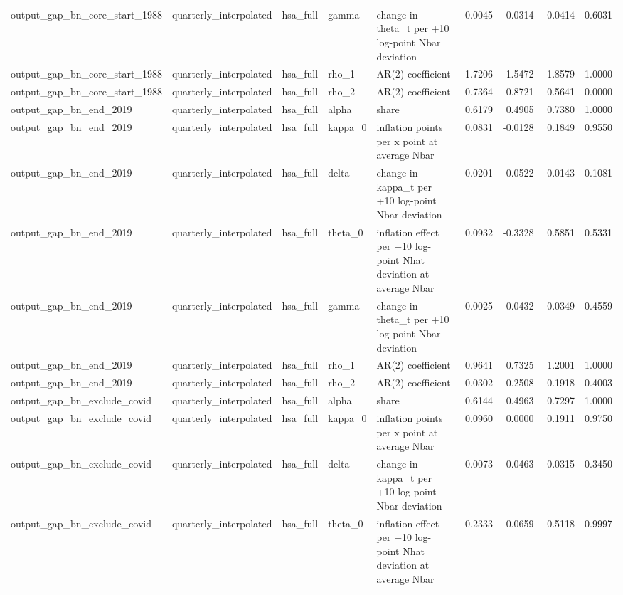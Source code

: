 \begin{tabular}{lllllrrrr}
output\_gap\_bn\_core\_start\_1988 & quarterly\_interpolated & hsa\_full & gamma & change in theta\_t per +10 log-point Nbar deviation & 0.0045 & -0.0314 & 0.0414 & 0.6031 \\
output\_gap\_bn\_core\_start\_1988 & quarterly\_interpolated & hsa\_full & rho\_1 & AR(2) coefficient & 1.7206 & 1.5472 & 1.8579 & 1.0000 \\
output\_gap\_bn\_core\_start\_1988 & quarterly\_interpolated & hsa\_full & rho\_2 & AR(2) coefficient & -0.7364 & -0.8721 & -0.5641 & 0.0000 \\
output\_gap\_bn\_end\_2019 & quarterly\_interpolated & hsa\_full & alpha & share & 0.6179 & 0.4905 & 0.7380 & 1.0000 \\
output\_gap\_bn\_end\_2019 & quarterly\_interpolated & hsa\_full & kappa\_0 & inflation points per x point at average Nbar & 0.0831 & -0.0128 & 0.1849 & 0.9550 \\
output\_gap\_bn\_end\_2019 & quarterly\_interpolated & hsa\_full & delta & change in kappa\_t per +10 log-point Nbar deviation & -0.0201 & -0.0522 & 0.0143 & 0.1081 \\
output\_gap\_bn\_end\_2019 & quarterly\_interpolated & hsa\_full & theta\_0 & inflation effect per +10 log-point Nhat deviation at average Nbar & 0.0932 & -0.3328 & 0.5851 & 0.5331 \\
output\_gap\_bn\_end\_2019 & quarterly\_interpolated & hsa\_full & gamma & change in theta\_t per +10 log-point Nbar deviation & -0.0025 & -0.0432 & 0.0349 & 0.4559 \\
output\_gap\_bn\_end\_2019 & quarterly\_interpolated & hsa\_full & rho\_1 & AR(2) coefficient & 0.9641 & 0.7325 & 1.2001 & 1.0000 \\
output\_gap\_bn\_end\_2019 & quarterly\_interpolated & hsa\_full & rho\_2 & AR(2) coefficient & -0.0302 & -0.2508 & 0.1918 & 0.4003 \\
output\_gap\_bn\_exclude\_covid & quarterly\_interpolated & hsa\_full & alpha & share & 0.6144 & 0.4963 & 0.7297 & 1.0000 \\
output\_gap\_bn\_exclude\_covid & quarterly\_interpolated & hsa\_full & kappa\_0 & inflation points per x point at average Nbar & 0.0960 & 0.0000 & 0.1911 & 0.9750 \\
output\_gap\_bn\_exclude\_covid & quarterly\_interpolated & hsa\_full & delta & change in kappa\_t per +10 log-point Nbar deviation & -0.0073 & -0.0463 & 0.0315 & 0.3450 \\
output\_gap\_bn\_exclude\_covid & quarterly\_interpolated & hsa\_full & theta\_0 & inflation effect per +10 log-point Nhat deviation at average Nbar & 0.2333 & 0.0659 & 0.5118 & 0.9997 \\

\end{tabular}
